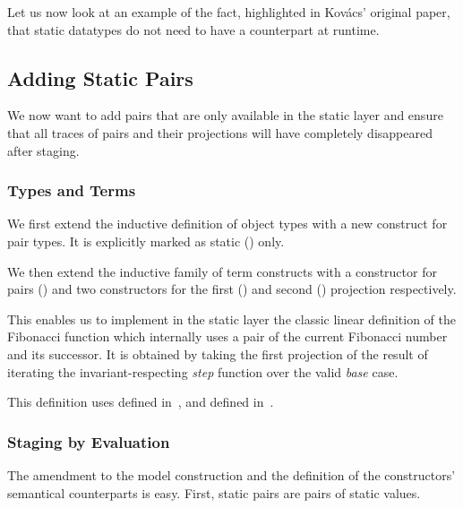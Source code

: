 Let us now look at an example of the fact, highlighted in
Kov{\'{a}}cs' original paper, that static datatypes do not
need to have a counterpart at runtime.

\subsection{Adding Static Pairs}\label{sec:stagingmodelprod}

We now want to add pairs that are only available in the static
layer and ensure that all traces of pairs and their projections
will have completely disappeared after staging.

\subsubsection{Types and Terms}

We first extend the inductive definition of object types
with a new construct for pair types. It is explicitly
marked as static () only.


We then extend the inductive family of term constructs
with a constructor for pairs () and two constructors
for the first () and second () projection
respectively.


This enables us to implement in the static layer the classic
linear definition of the Fibonacci function which internally
uses a pair of the current Fibonacci number and its successor.
%
It is obtained by taking the first projection of the result
of iterating the invariant-respecting \emph{step} function
over the valid \emph{base} case.


This definition uses  defined in~,
and  defined in~.

\subsubsection{Staging by Evaluation}

The amendment to the model construction and the definition of the
constructors' semantical counterparts is easy.
%
First, static pairs are pairs of static values.


